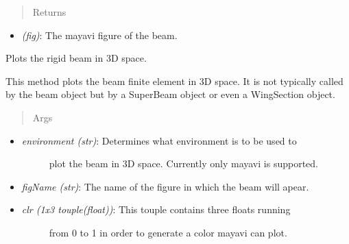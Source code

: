 \documentclass[letterpaper,10pt,english]{sphinxmanual}
\begin{document}
\begin{fulllineitems}
\begin{fulllineitems}
\begin{itemize}
\begin{description}
\end{description}

\end{itemize}
\begin{quote}\begin{description}
\item[{Returns}] \leavevmode
\end{description}\end{quote}
\begin{itemize}
\item {} 
\emph{(fig)}: The mayavi figure of the beam.

\end{itemize}

\end{fulllineitems}


\begin{fulllineitems}
\label{structures:AeroComBAT.Structures.TBeam.plotRigidBeam}
Plots the rigid beam in 3D space.

This method plots the beam finite element in 3D space. It is not
typically called by the beam object but by a SuperBeam object or
even a WingSection object.
\begin{quote}\begin{description}
\item[{Args}] \leavevmode
\end{description}\end{quote}
\begin{itemize}
\item {} \begin{description}
\item[{\emph{environment (str)}: Determines what environment is to be used to}] \leavevmode
plot the beam in 3D space. Currently only mayavi is supported.

\end{description}

\item {} 
\emph{figName (str)}: The name of the figure in which the beam will apear.

\item {} \begin{description}
\item[{\emph{clr (1x3 touple(float))}: This touple contains three floats running}] \leavevmode
from 0 to 1 in order to generate a color mayavi can plot.


\end{description}
\end{itemize}
\end{fulllineitems}
\end{fulllineitems}
\end{document}
